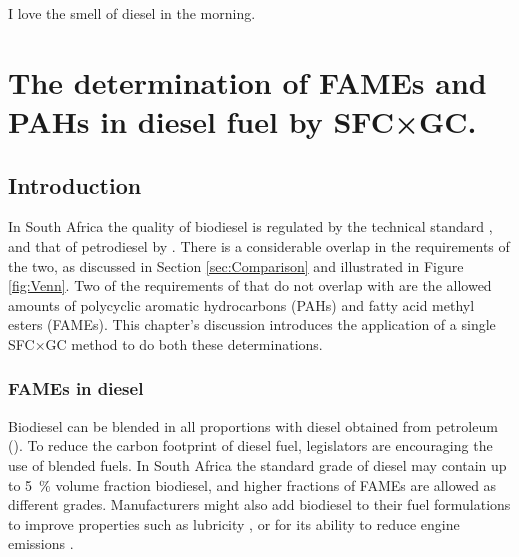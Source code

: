 
\begin{savequote}[\quotewidth]
I love the smell of diesel in the morning.
\end{savequote}

\chapter{The determination of FAMEs and PAHs in diesel fuel by SFC×GC.} %
\label{Chapter7} %

\section{Introduction}

In South Africa the quality of biodiesel is regulated by the technical standard
, and that of petrodiesel by . There is a
considerable overlap in the requirements of the two, as discussed in Section
\ref{sec:Comparison} and illustrated in Figure \ref{fig:Venn}. Two of the
requirements of  that do not overlap with  are the
allowed amounts of polycyclic aromatic hydrocarbons (PAHs) and fatty acid methyl
esters (FAMEs). This chapter's discussion introduces the application of a single
SFC×GC method to do both these determinations.

\subsection{FAMEs in diesel}

Biodiesel can be blended in all proportions with diesel obtained from petroleum
(). To reduce the carbon footprint of diesel fuel,
legislators are encouraging the use of blended fuels. In South Africa the
standard grade of diesel may contain up to \SI{5}{\percent} volume fraction
biodiesel, and higher fractions of FAMEs are allowed as different grades.
Manufacturers might also add biodiesel to their fuel formulations to improve
properties such as lubricity \autocite{Knothe2005}, or for its ability to reduce
engine emissions \autocite{Wattrus2016}.

